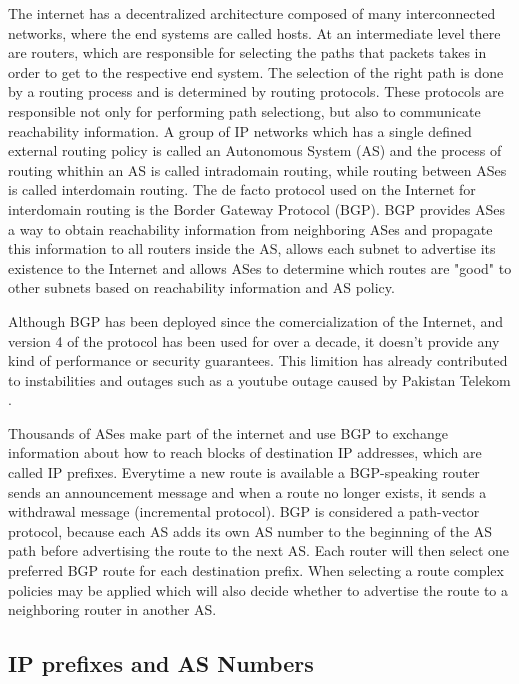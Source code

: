 \documentclass[11pt,a4paper]{scrreprt}
\begin{document}
The internet has a decentralized architecture composed of many interconnected networks, where the end systems are called hosts. At an intermediate level there are routers, which are responsible for selecting the paths that packets takes in order to get to the respective end system. The selection of the right path is done by a routing process and is determined by routing protocols. These protocols are responsible not only for performing path selectiong, but also to communicate reachability information. A group of IP networks which has a single defined external routing policy is called an Autonomous System (AS) and the process of routing whithin an AS is called intradomain routing, while routing between ASes is called interdomain routing. The de facto protocol used on the Internet for interdomain routing is the Border Gateway Protocol (BGP). BGP provides ASes a way to obtain reachability information from neighboring ASes and propagate this information to all routers inside the AS, allows each subnet to advertise its existence to the Internet and allows ASes to determine which routes are "good" to other subnets based on reachability information and AS policy.

Although BGP has been deployed since the comercialization of the Internet, and version 4 of the protocol has been used for over a decade, it doesn't provide any kind of performance or security guarantees. This limition has already contributed to instabilities and outages \cite{Misdirection} such as a youtube outage caused by Pakistan Telekom \cite{Pakistan}. 

Thousands of ASes make part of the internet and use BGP to exchange information about how to reach blocks of destination IP addresses, which are called IP prefixes. Everytime a new route is available a BGP-speaking router sends an announcement message and when a route no longer exists, it sends a withdrawal message (incremental protocol). BGP is considered a path-vector protocol, because each AS adds its own AS number to the beginning of the AS path before advertising the route to the next AS. Each router will then select one preferred BGP route for each destination prefix. When selecting a route complex policies may be applied which will also decide whether to advertise the route to a neighboring router in another AS.   

\subsection{IP prefixes and AS Numbers}
	
\end{document}
